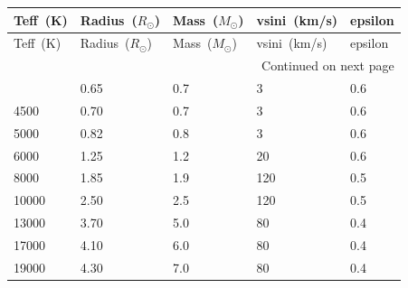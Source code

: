 \begin{longtable}{lllll}
\toprule
Teff~(K) & Radius~($R_{\odot}$) & Mass~($M_{\odot}$) & vsini~(km/s) & epsilon \\
\midrule
\endfirsthead
\toprule
Teff~(K) & Radius~($R_{\odot}$) & Mass~($M_{\odot}$) & vsini~(km/s) & epsilon \\
\midrule
\endhead
\midrule
\multicolumn{5}{r}{Continued on next page} \\
\midrule
\endfoot
\bottomrule
\endlastfoot
4000 & 0.65 & 0.7 & 3 & 0.6 \\
4500 & 0.70 & 0.7 & 3 & 0.6 \\
5000 & 0.82 & 0.8 & 3 & 0.6 \\
6000 & 1.25 & 1.2 & 20 & 0.6 \\
8000 & 1.85 & 1.9 & 120 & 0.5 \\
10000 & 2.50 & 2.5 & 120 & 0.5 \\
13000 & 3.70 & 5.0 & 80 & 0.4 \\
17000 & 4.10 & 6.0 & 80 & 0.4 \\
19000 & 4.30 & 7.0 & 80 & 0.4 \\
\end{longtable}
